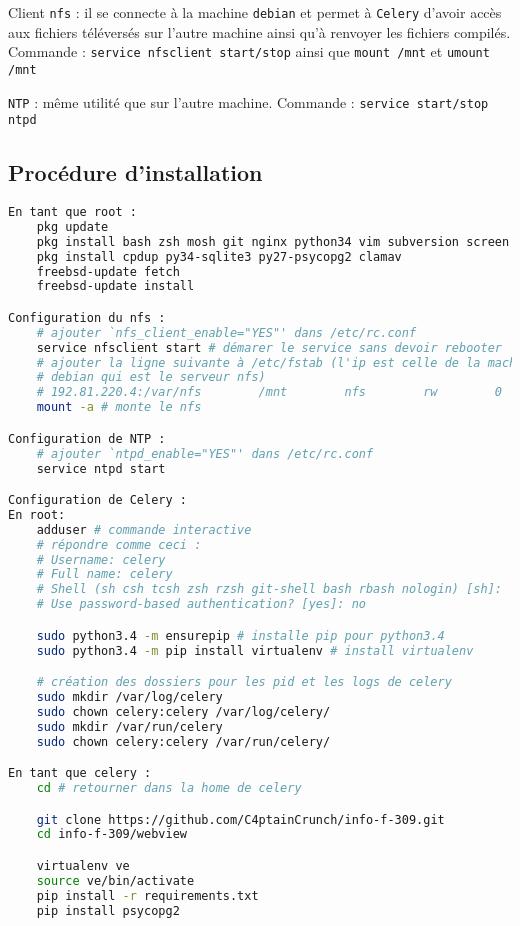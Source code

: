 \documentclass[10pt,a4paper]{article}
\begin{document}
Client \texttt{nfs} : il se connecte à la machine \texttt{debian} et permet à \texttt{Celery} d'avoir accès aux fichiers téléversés sur l'autre machine ainsi qu'à renvoyer les fichiers compilés.
Commande : \texttt{service nfsclient start/stop} ainsi que \texttt{mount /mnt} et \texttt{umount /mnt}

\texttt{NTP} : même utilité que sur l'autre machine.
Commande : \texttt{service start/stop ntpd}

\subsection{Procédure d'installation}

\begin{lstlisting}[language=bash]
En tant que root :
    pkg update
    pkg install bash zsh mosh git nginx python34 vim subversion screen
    pkg install cpdup py34-sqlite3 py27-psycopg2 clamav
    freebsd-update fetch
    freebsd-update install

Configuration du nfs :
    # ajouter `nfs_client_enable="YES"' dans /etc/rc.conf
    service nfsclient start # démarer le service sans devoir rebooter
    # ajouter la ligne suivante à /etc/fstab (l'ip est celle de la machine
    # debian qui est le serveur nfs)
    # 192.81.220.4:/var/nfs        /mnt        nfs        rw        0        0
    mount -a # monte le nfs

Configuration de NTP :
    # ajouter `ntpd_enable="YES"' dans /etc/rc.conf
    service ntpd start

Configuration de Celery :
En root:
    adduser # commande interactive
    # répondre comme ceci :
    # Username: celery
    # Full name: celery
    # Shell (sh csh tcsh zsh rzsh git-shell bash rbash nologin) [sh]:  bash
    # Use password-based authentication? [yes]: no

    sudo python3.4 -m ensurepip # installe pip pour python3.4
    sudo python3.4 -m pip install virtualenv # install virtualenv

    # création des dossiers pour les pid et les logs de celery
    sudo mkdir /var/log/celery
    sudo chown celery:celery /var/log/celery/
    sudo mkdir /var/run/celery
    sudo chown celery:celery /var/run/celery/

En tant que celery :
    cd # retourner dans la home de celery

    git clone https://github.com/C4ptainCrunch/info-f-309.git
    cd info-f-309/webview

    virtualenv ve
    source ve/bin/activate
    pip install -r requirements.txt
    pip install psycopg2


\end{lstlisting}
\end{document}
